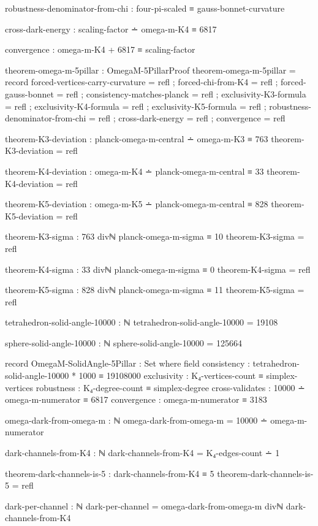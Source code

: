 \documentclass[11pt,a4paper]{book}
\begin{document}
\begin{code}
    robustness-denominator-from-chi : four-pi-scaled ≡ gauss-bonnet-curvature
    
    cross-dark-energy : scaling-factor ∸ omega-m-K4 ≡ 6817
    
    convergence : omega-m-K4 + 6817 ≡ scaling-factor

theorem-omega-m-5pillar : OmegaM-5PillarProof
theorem-omega-m-5pillar = record
  { forced-vertices-carry-curvature = refl
  ; forced-chi-from-K4 = refl
  ; forced-gauss-bonnet = refl
  ; consistency-matches-planck = refl
  ; exclusivity-K3-formula = refl
  ; exclusivity-K4-formula = refl
  ; exclusivity-K5-formula = refl
  ; robustness-denominator-from-chi = refl
  ; cross-dark-energy = refl
  ; convergence = refl
  }

theorem-K3-deviation : planck-omega-m-central ∸ omega-m-K3 ≡ 763
theorem-K3-deviation = refl

theorem-K4-deviation : omega-m-K4 ∸ planck-omega-m-central ≡ 33
theorem-K4-deviation = refl

theorem-K5-deviation : omega-m-K5 ∸ planck-omega-m-central ≡ 828
theorem-K5-deviation = refl

theorem-K3-sigma : 763 divℕ planck-omega-m-sigma ≡ 10
theorem-K3-sigma = refl

theorem-K4-sigma : 33 divℕ planck-omega-m-sigma ≡ 0
theorem-K4-sigma = refl

theorem-K5-sigma : 828 divℕ planck-omega-m-sigma ≡ 11
theorem-K5-sigma = refl

tetrahedron-solid-angle-10000 : ℕ
tetrahedron-solid-angle-10000 = 19108

sphere-solid-angle-10000 : ℕ
sphere-solid-angle-10000 = 125664

record OmegaM-SolidAngle-5Pillar : Set where
  field
    consistency     : tetrahedron-solid-angle-10000 * 1000 ≡ 19108000
    exclusivity     : K₄-vertices-count ≡ simplex-vertices
    robustness      : K₄-degree-count ≡ simplex-degree
    cross-validates : 10000 ∸ omega-m-numerator ≡ 6817
    convergence     : omega-m-numerator ≡ 3183

omega-dark-from-omega-m : ℕ
omega-dark-from-omega-m = 10000 ∸ omega-m-numerator

dark-channels-from-K4 : ℕ
dark-channels-from-K4 = K₄-edges-count ∸ 1

theorem-dark-channels-is-5 : dark-channels-from-K4 ≡ 5
theorem-dark-channels-is-5 = refl

dark-per-channel : ℕ
dark-per-channel = omega-dark-from-omega-m divℕ dark-channels-from-K4


\end{code}
\end{document}
